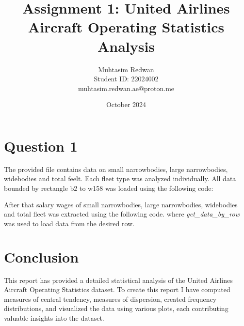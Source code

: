 \documentclass[a4paper,12pt]{article}
\title{Assignment 1: United Airlines Aircraft Operating Statistics Analysis}
\author{Muhtasim Redwan \\ Student ID: 22024002 \\ muhtasim.redwan.ae@proton.me}
\date{October 2024}
\begin{document}
\maketitle




\section{Question 1}
The provided file contains data on small narrowbodies, large narrowbodies, widebodies and total feelt. Each fleet
type was analyzed individually. All data bounded by rectangle b2 to w158 was loaded using the following code:


After that salary wages of small narrowbodies, large narrowbodies, widebodies and total fleet was extracted using the following code. where \textit{get\_data\_by\_row} was used to load data from the desired row.








\section*{Conclusion}
This report has provided a detailed statistical analysis of the United Airlines Aircraft Operating Statistics dataset. To create this report I have computed measures of central tendency, measures of dispersion, created frequency distributions, and visualized the data using various plots, each contributing valuable insights into the dataset.
\end{document}
